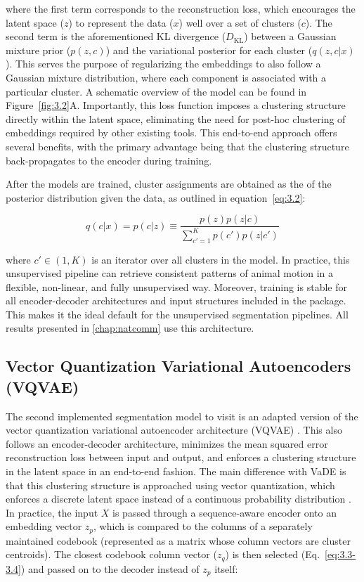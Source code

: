 \noindent where the first term corresponds to the reconstruction loss, which encourages the latent space ($z$) to represent the data ($x$) well over a set of clusters ($c$). The second term is the aforementioned KL divergence ($D_\mathrm{KL}$) between a Gaussian mixture prior ($p(z,c)$) and the variational posterior for each cluster ($q(z,c|x)$). This serves the purpose of regularizing the embeddings to also follow a Gaussian mixture distribution, where each component is associated with a particular cluster. A schematic overview of the model can be found in Figure~\ref{fig:3.2}A.
Importantly, this loss function imposes a clustering structure directly within the latent space, eliminating the need for post-hoc clustering of embeddings required by other existing tools. This end-to-end approach offers several benefits, with the primary advantage being that the clustering structure back-propagates to the encoder during training.

After the models are trained, cluster assignments are obtained as the  of the posterior distribution given the data, as outlined in equation~\ref{eq:3.2}:

\begin{equation}
q(c|x) = p(c|z) \equiv \frac{p(z)p(z|c)}{\sum_{c'=1}^K p(c')p(z|c')}
\label{eq:3.2}
\end{equation}

\noindent where $c'\in(1, K)$ is an iterator over all clusters in the model.
In practice, this unsupervised pipeline can retrieve consistent patterns of animal motion in a flexible, non-linear, and fully unsupervised way. Moreover, training is stable for all encoder-decoder architectures and input structures included in the package. This makes it the ideal default for the unsupervised segmentation pipelines. All results presented in \cref{chap:natcomm} use this architecture.

\subsection{Vector Quantization Variational Autoencoders (VQVAE)}

The second implemented segmentation model to visit is an adapted version of the vector quantization variational autoencoder architecture (VQVAE) \cite{VanDenOord2017NeuralLearning}. This also follows an encoder-decoder architecture, minimizes the mean squared error reconstruction loss between input and output, and enforces a clustering structure in the latent space in an end-to-end fashion. The main difference with VaDE is that this clustering structure is approached using vector quantization, which enforces a discrete latent space instead of a continuous probability distribution \cite{VanDenOord2017NeuralLearning}. In practice, the input $X$ is passed through a sequence-aware encoder onto an embedding vector $z_p$, which is compared to the columns of a separately maintained codebook (represented as a matrix whose column vectors are cluster centroids). The closest codebook column vector ($z_q$) is then selected (Eq.~\ref{eq:3.3-3.4}) and passed on to the decoder instead of $z_p$ itself:

